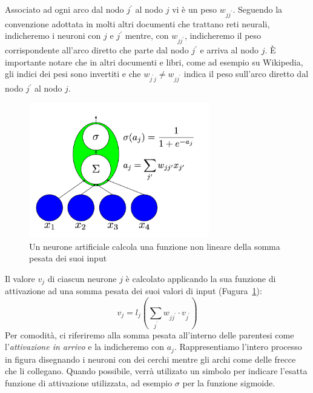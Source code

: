 Associato ad ogni arco dal nodo $j^{'}$ al nodo $j$ vi \`e un peso $w_{jj^{'}}$.
Seguendo la convenzione adottata in molti altri documenti che trattano reti neurali,
indicheremo i neuroni con $j$ e $j^{'}$ mentre, con $w_{jj^{'}}$, indicheremo il
peso corrispondente all'arco diretto che parte dal nodo $j^{'}$ e arriva al nodo $j$.
\`E importante notare che in altri documenti e libri, come ad esempio su Wikipedia,
gli indici dei pesi sono invertiti e che $w_{j^{'}j} \neq w_{jj^{'}}$ indica il
peso sull'arco diretto dal nodo $j^{'}$ al nodo $j$.

\begin{figure}[tp]
  \centering
  \begin{center}
    \includegraphics[width=0.7\textwidth]{./images/artificialNeuron.png}
  \end{center}
  \caption{Un neurone artificiale calcola una funzione non lineare della somma
  pesata dei suoi input}
  \label{fig:artificialNeuron}
\end{figure}

Il valore $v_j$ di ciascun neurone $j$ \`e calcolato applicando la sua funzione
di attivazione ad una somma pesata dei suoi valori di input
(Fugura~\ref{fig:artificialNeuron}):
\begin{equation} %
  v_j = l_j\left( \sum_{j^{'}} w_{jj^{'}} \cdot v_{j^{'}} \right)
\end{equation}
Per comodit\`a, ci riferiremo alla somma pesata all'interno delle parentesi come
l'\emph{attivazione in arrivo} e la indicheremo con $a_j$. Rappresentiamo
l'intero processo in figura disegnando i neuroni con dei cerchi mentre gli archi
come delle frecce che li collegano. Quando possibile, verr\`a utilizato un simbolo
per indicare l'esatta funzione di attivazione utilizzata, ad esempio $\sigma$ per
la funzione sigmoide.

